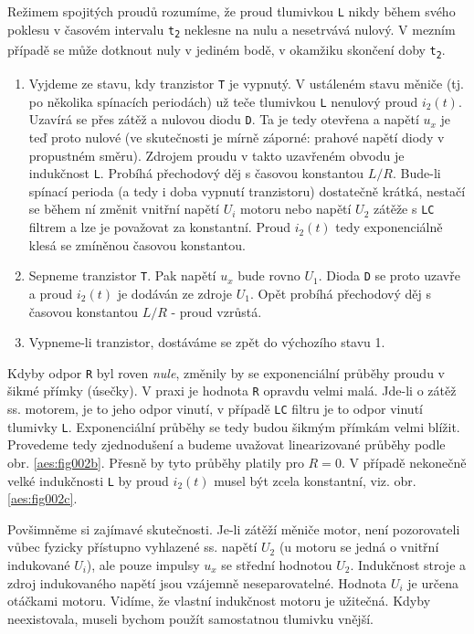       Režimem spojitých proudů rozumíme, že proud tlumivkou \texttt{L} nikdy během svého poklesu v 
      časovém intervalu \texttt{t\textsubscript{2}} neklesne na nulu a nesetrvává nulový. V mezním 
      případě se může dotknout nuly v jediném bodě, v okamžiku skončení doby 
      \texttt{t\textsubscript{2}}.
      \begin{enumerate}[noitemsep]
        \item Vyjdeme ze stavu, kdy tranzistor \texttt{T} je vypnutý. V ustáleném stavu měniče (tj. 
              po několika spínacích periodách) už teče tlumivkou \texttt{L} nenulový proud 
              \(i_2(t)\). Uzavírá se přes zátěž a nulovou diodu \texttt{D}. Ta je tedy otevřena a 
              napětí \(u_x\) je teď proto nulové (ve skutečnosti je mírně záporné: prahové napětí 
              diody v propustném směru). Zdrojem proudu v takto uzavřeném obvodu je indukčnost 
              \texttt{L}. Probíhá přechodový děj s časovou konstantou \(L/R\). Bude-li spínací 
              perioda (a tedy i doba vypnutí tranzistoru) dostatečně krátká, nestačí se během ní 
              změnit vnitřní napětí \(U_i\) motoru nebo napětí \(U_2\) zátěže s \texttt{LC} filtrem 
              a lze je považovat za konstantní. Proud \(i_2(t)\) tedy exponenciálně klesá se 
              zmíněnou časovou konstantou.
        \item Sepneme tranzistor \texttt{T}. Pak napětí \(u_x\) bude rovno \(U_1\). Dioda 
              \texttt{D} se proto uzavře a proud \(i_2(t)\) je dodáván ze zdroje \(U_1\). Opět 
              probíhá přechodový děj s časovou konstantou \(L/R\) - proud vzrůstá.
        \item Vypneme-li tranzistor, dostáváme se zpět do výchozího stavu 1.
      \end{enumerate}
      
      Kdyby odpor \texttt{R} byl roven \emph{nule}, změnily by se exponenciální průběhy proudu v 
      šikmé přímky (úsečky). V praxi je hodnota \texttt{R} opravdu velmi malá. Jde-li o zátěž ss. 
      motorem, je to jeho odpor vinutí, v případě \texttt{LC} filtru je to odpor vinutí tlumivky 
      \texttt{L}. Exponenciální průběhy se tedy budou šikmým přímkám velmi blížit. Provedeme tedy 
      zjednodušení a budeme uvažovat linearizované průběhy podle obr. \ref{aes:fig002b}.
      Přesně by tyto průběhy platily pro \(R = 0\). V případě nekonečně velké indukčnosti 
      \texttt{L} by proud \(i_2(t)\) musel být zcela konstantní, viz. obr. \ref{aes:fig002c}.
      
      \begin{tcnote}
        Povšimněme si zajímavé skutečnosti. Je-li zátěží měniče motor, není pozorovateli vůbec 
        fyzicky přístupno vyhlazené ss. napětí \(U_2\) (u motoru se jedná o vnitřní indukované 
        \(U_i\)), ale pouze impulsy \(u_x\) se střední hodnotou \(U_2\). Indukčnost stroje a zdroj 
        indukovaného napětí jsou vzájemně neseparovatelné. Hodnota \(U_i\) je určena otáčkami 
        motoru. Vidíme, že vlastní indukčnost motoru je užitečná. Kdyby neexistovala, museli bychom 
        použít samostatnou tlumivku vnější.
      \end{tcnote}
      
